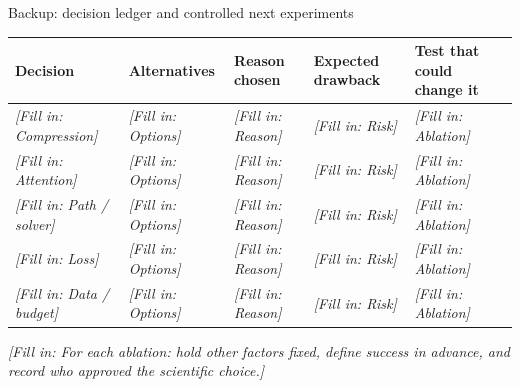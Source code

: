 \documentclass[aspectratio=169,11pt]{beamer}
\newcommand{\fillin}[1]{{\color{prompt}\textit{[Fill in: #1]}}}
\begin{document}
\begin{frame}{Backup: decision ledger and controlled next experiments}
  \scriptsize
  \begin{tabularx}{\linewidth}{XXXXX}
    \toprule
    Decision & Alternatives & Reason chosen & Expected drawback & Test that could change it \\
    \midrule
    \fillin{Compression} & \fillin{Options} & \fillin{Reason} & \fillin{Risk} & \fillin{Ablation} \\
    \fillin{Attention} & \fillin{Options} & \fillin{Reason} & \fillin{Risk} & \fillin{Ablation} \\
    \fillin{Path / solver} & \fillin{Options} & \fillin{Reason} & \fillin{Risk} & \fillin{Ablation} \\
    \fillin{Loss} & \fillin{Options} & \fillin{Reason} & \fillin{Risk} & \fillin{Ablation} \\
    \fillin{Data / budget} & \fillin{Options} & \fillin{Reason} & \fillin{Risk} & \fillin{Ablation} \\
    \bottomrule
  \end{tabularx}
  \medskip
  \fillin{For each ablation: hold other factors fixed, define success in advance, and record who approved the scientific choice.}
\end{frame}
\end{document}

